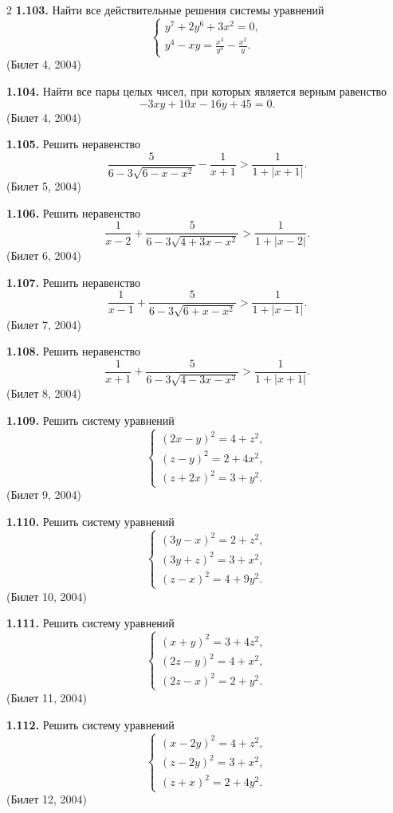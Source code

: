 \documentclass[14pt,a4paper,landscape]{extarticle}
\begin{document}
\begin{multicols}{2}
\textbf{1.103.} Найти все действительные решения системы уравнений
\[
\begin{cases}
y^7 + 2y^6 + 3x^2 = 0, \\[1ex]
y^4 - xy = \frac{x^3}{y^4} - \frac{x^2}{y}.
\end{cases}
\]
\hfill \textnormal{(Билет 4, 2004)}

\textbf{1.104.} Найти все пары целых чисел, при которых является верным равенство
\[
-3xy + 10x - 16y + 45 = 0.
\]
\hfill \textnormal{(Билет 4, 2004)}

\textbf{1.105.} Решить неравенство
\[
\frac{5}{6 - 3\sqrt{6 - x - x^2}} - \frac{1}{x + 1} > \frac{1}{1 + |x + 1|}.
\]
\hfill \textnormal{(Билет 5, 2004)}

\textbf{1.106.} Решить неравенство
\[
\frac{1}{x - 2} + \frac{5}{ 6 - 3\sqrt{4 + 3x - x^2}} > \frac{1}{1 + |x - 2|}.
\]
\hfill \textnormal{(Билет 6, 2004)}

\textbf{1.107.} Решить неравенство
\[
\frac{1}{x - 1} + \frac{5}{6 - 3\sqrt{6 + x - x^2}} > \frac{1}{1 + |x - 1|}.
\]
\hfill \textnormal{(Билет 7, 2004)}

\textbf{1.108.} Решить неравенство
\[
\frac{1}{x + 1} +\frac{5}{ 6 - 3\sqrt{4 - 3x - x^2}} > \frac{1}{1 + |x + 1|}.
\]
\hfill \textnormal{(Билет 8, 2004)}

\textbf{1.109.} Решить систему уравнений
\[
\begin{cases}
(2x - y)^2 = 4 + z^2, \\
(z - y)^2 = 2 + 4x^2, \\
(z + 2x)^2 = 3 + y^2.
\end{cases}
\]
\hfill \textnormal{(Билет 9, 2004)}

\textbf{1.110.} Решить систему уравнений
\[
\begin{cases}
(3y - x)^2 = 2 + z^2, \\
(3y + z)^2 = 3 + x^2, \\
(z - x)^2 = 4 + 9y^2.
\end{cases}
\]
\hfill \textnormal{(Билет 10, 2004)}

\textbf{1.111.} Решить систему уравнений
\[
\begin{cases}
(x + y)^2 = 3 + 4z^2, \\
(2z - y)^2 = 4 + x^2, \\
(2z - x)^2 = 2 + y^2.
\end{cases}
\]
\hfill \textnormal{(Билет 11, 2004)}

\textbf{1.112.} Решить систему уравнений
\[
\begin{cases}
(x - 2y)^2 = 4 + z^2, \\
(z - 2y)^2 = 3 + x^2, \\
(z + x)^2 = 2 + 4y^2.
\end{cases}
\]
\hfill \textnormal{(Билет 12, 2004)}


\end{multicols}
\end{document}
